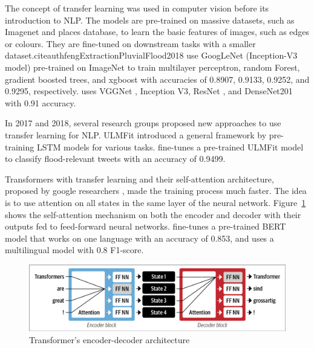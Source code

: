 The concept of transfer learning was used in computer vision before its introduction to \ac{NLP}.
The models are pre-trained on massive datasets, such as Imagenet
\cite{krizhevskyImageNetClassificationDeep2017} and places database,
\cite{zhouLearningDeepFeatures2014} to learn the basic features of images, such as
edges or colours. They are fine-tuned on downstream tasks with a smaller dataset.citeauth{fengExtractionPluvialFlood2018} use GoogLeNet
(Inception-V3 model) \cite{7780677} pre-trained on ImageNet to train multilayer perceptron, random
Forest, gradient boosted trees, and  xgboost with accuracies of 0.8907, 0.9133, 0.9252, and 0.9295,
respectively.  uses VGGNet
\cite{simonyanVeryDeepConvolutional2015}, Inception V3, ResNet \cite{heDeepResidualLearning2015},
and DenseNet201 \cite{huangDenselyConnectedConvolutional2018} with 0.91 accuracy.


In 2017 and 2018, several research groups proposed new approaches to use transfer learning for
\ac{NLP}. \ac{ULMFit} \cite{howardUniversalLanguageModel2018} introduced a general framework by
pre-training \ac{LSTM} models for various tasks.
 fine-tunes a pre-trained \ac{ULMFit} model
to classify flood-relevant tweets with an accuracy of 0.9499. 

Transformers with transfer learning and their self-attention architecture, proposed by google
researchers \cite{vaswaniAttentionAllYou2017}, made the training process much faster. The idea is to
use attention on all states in the same layer of the neural network.
Figure~\ref{fig:encoder_decoder_transformer} shows the self-attention mechanism on both the encoder
and decoder with their outputs fed to feed-forward neural networks.
 fine-tunes a pre-trained
\ac{BERT}\cite{devlinBERTPretrainingDeep2019}  model that works on one language with an accuracy of
0.853, and  uses a multilingual model with 0.8
F1-score.

\begin{figure}[H]
\begin{center}
  \includegraphics[width=12cm, trim={0.1cm 0.1cm 0.1cm 0.1cm},clip]{./images/encoder-decoder_transformer.png}
\end{center}
\caption{Transformer's encoder-decoder architecture \cite{tunstallNaturalLanguageProcessing2022}}
\label{fig:encoder_decoder_transformer}
\end{figure}


